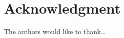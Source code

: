 \documentclass[journal]{IEEEtran}
\begin{document}
\section*{Acknowledgment}
The authors would like to thank\ldots



\end{document}
